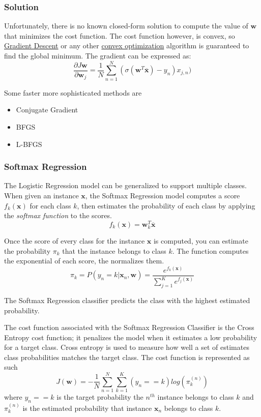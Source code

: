 \documentclass[12pt]{article}
\begin{document}
        \subsubsection{Solution}
            Unfortunately, there is no known closed-form solution to compute the value of $\boldsymbol{w}$ that
            minimizes the cost function. The cost function however, is convex, so \hyperref[sec:GD]{Gradient Descent} or
            any other \hyperref[sec:ConvexOptimization]{convex optimization} algorithm is guaranteed to find the global
            minimum. The gradient can be expressed as:
            $$ \frac{\partial J{\boldsymbol{w}}}{\partial \boldsymbol{w}_j} =
            \frac{1}{N}\sum_{n=1}^N(\sigma(\boldsymbol{w}^T\overline{\boldsymbol{x}}) - y_n) x_{j,n}) $$
            
            Some faster more sophisticated methods are
            \begin{itemize}
                \item Conjugate Gradient
                \item BFGS
                \item L-BFGS
            \end{itemize}

        \subsubsection{Softmax Regression} \label{sec:Softmax} The Logistic Regression model can be generalized to
            support multiple classes. When given an instance $\boldsymbol{x}$, the Softmax Regression model computes a
            score $f_k(\boldsymbol{x})$ for each class $k$, then estimates the probability of each class by applying the
            \textit{softmax function} to the scores. 
            $$ f_k(\boldsymbol{x}) = \boldsymbol{w}^T_k \overline{\boldsymbol{x}} $$

            Once the score of every class for the instance $\boldsymbol{x}$ is computed, you can estimate the
            probability $\pi_k$ that the instance belongs to class $k$. The function computes the exponential of each
            score, the normalizes them.
            $$ \pi_k = P(y_n = k | \boldsymbol{x}_n, \boldsymbol{w}) = \frac{e^{f_k(\boldsymbol{x})}}{\sum_{j=1}^K
            e^{f_j(\boldsymbol{x})}} $$

            The Softmax Regression classifier predicts the class with the highest estimated probability.

            The cost function associated with the Softmax Regression Classifier is the Cross Entropy cost function; it
            penalizes the model when it estimates a low probability for a target class. Cross entropy is used to measure
            how well a set of estimates class probabilities matches the target class. The cost function is represented
            as such
            $$ J(\boldsymbol{w}) = -\frac{1}{N}\sum_{n=1}^N \sum_{k=1}^K (y_n == k) log(\pi_{k}^{(n)}) $$ where $y_n ==
            k$ is the target probability the $n^{th}$ instance belongs to class $k$ and $\pi_{k}^{(n)}$ is the estimated
            probability that instance $\boldsymbol{x}_n$ belongs to class $k$.
\end{document}
